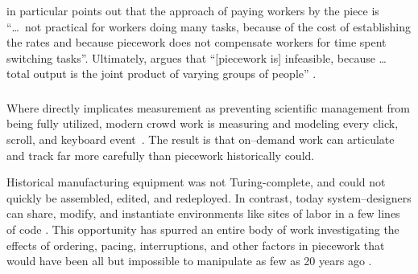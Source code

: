 \documentclass[trackingWork]{subfiles}
\begin{document}
\citeauthor{bewley1999wages} in particular points out that
the approach of paying workers by the piece is
``\dots~not practical for workers doing many tasks, because of
the cost of establishing the rates and because
piecework does not compensate workers for time spent switching tasks''.
Ultimately, \citeauthor{bewley1999wages} argues that
``[piecework is] infeasible, because \dots
total output is the joint product of varying groups of people''
\cite{bewley1999wages}.


\subsubsection{\whatchanged}
\begin{comment}
outline
	- measurement is more precise, so decomposition is deeper
	- not a single position, but a marketplace
\end{comment}

Where \citeauthor{10.2307/23702539} directly implicates measurement as
preventing scientific management from being fully utilized,
modern crowd work is measuring and modeling every click, scroll, and keyboard event~\cite{rzeszotarski2011instrumenting,rzeszotarski2012crowdscape}.
The result is that on--demand work can articulate and track far more carefully than piecework historically could.

Historical manufacturing equipment was not Turing-complete, and could not quickly be assembled, edited, and redeployed.
In contrast, today system--designers can share, modify, and instantiate environments
like sites of labor in a few lines of code
\cite{lessig2006code,turkitLittle}.
This opportunity has spurred an entire body of work investigating the effects of
ordering,
pacing,
interruptions, and
other factors in piecework that would have been
all but impossible to manipulate as few as 20 years ago
\cite{dai2015and,Cai:2016:CRI:2858036.2858237,cheng2015break,measuringCrowdsourcingCheng,embracingErrorKrishna}.
 
\end{document}
